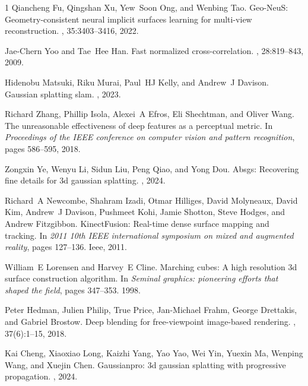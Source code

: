 \begin{thebibliography}{1}
Qiancheng Fu, Qingshan Xu, Yew~Soon Ong, and Wenbing Tao.
\newblock Geo-NeuS: Geometry-consistent neural implicit surfaces learning for multi-view reconstruction.
, 35:3403--3416, 2022.

Jae-Chern Yoo and Tae~Hee Han.
\newblock Fast normalized cross-correlation.
, 28:819--843, 2009.

Hidenobu Matsuki, Riku Murai, Paul~HJ Kelly, and Andrew~J Davison.
\newblock Gaussian splatting slam.
, 2023.

Richard Zhang, Phillip Isola, Alexei~A Efros, Eli Shechtman, and Oliver Wang.
\newblock The unreasonable effectiveness of deep features as a perceptual metric.
\newblock In {\em Proceedings of the IEEE conference on computer vision and pattern recognition}, pages 586--595, 2018.

Zongxin Ye, Wenyu Li, Sidun Liu, Peng Qiao, and Yong Dou.
\newblock Absgs: Recovering fine details for 3d gaussian splatting.
, 2024.

Richard~A Newcombe, Shahram Izadi, Otmar Hilliges, David Molyneaux, David Kim, Andrew~J Davison, Pushmeet Kohi, Jamie Shotton, Steve Hodges, and Andrew Fitzgibbon.
\newblock KinectFusion: Real-time dense surface mapping and tracking.
\newblock In {\em 2011 10th IEEE international symposium on mixed and augmented reality}, pages 127--136. Ieee, 2011.

William~E Lorensen and Harvey~E Cline.
\newblock Marching cubes: A high resolution 3d surface construction algorithm.
\newblock In {\em Seminal graphics: pioneering efforts that shaped the field}, pages 347--353. 1998.

Peter Hedman, Julien Philip, True Price, Jan-Michael Frahm, George Drettakis, and Gabriel Brostow.
\newblock Deep blending for free-viewpoint image-based rendering.
, 37(6):1--15, 2018.

Kai Cheng, Xiaoxiao Long, Kaizhi Yang, Yao Yao, Wei Yin, Yuexin Ma, Wenping Wang, and Xuejin Chen.
\newblock Gaussianpro: 3d gaussian splatting with progressive propagation.
, 2024.


\end{thebibliography}
